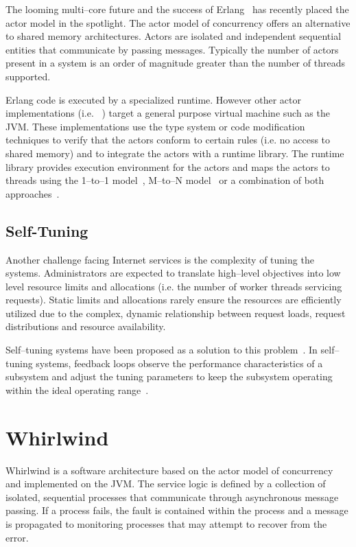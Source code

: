 \documentclass[conference,a4paper,final]{IEEEtran}
\begin{document}
The looming multi--core future and the success of Erlang~\cite{Nystrom:03:Telco,armstrong96erlang} has recently placed the actor model in the spotlight. The actor model of concurrency offers an alternative to shared memory architectures. Actors are isolated and independent sequential entities that communicate by passing messages. Typically the number of actors present in a system is an order of magnitude greater than the number of threads supported.

Erlang code is executed by a specialized runtime. However other actor implementations (i.e. ~\cite{Varela:SALSA,Haller:07:ScalaActors,Srinivasan:08:Kilim}) target a general purpose virtual machine such as the JVM. These implementations use the type system or code modification techniques to verify that the actors conform to certain rules (i.e. no access to shared memory) and to integrate the actors with a runtime library. The runtime library provides execution environment for the actors and maps the actors to threads using the 1--to--1 model~\cite{Varela:SALSA}, M--to--N model~\cite{Srinivasan:08:Kilim,Nystrom:03:Telco,armstrong96erlang} or a combination of both approaches~\cite{Haller:07:ScalaActors}.

\subsection{Self-Tuning}

Another challenge facing Internet services is the complexity of tuning the systems. Administrators are expected to translate high--level objectives into low level resource limits and allocations (i.e. the number of worker threads servicing requests). Static limits and allocations rarely ensure the resources are efficiently utilized due to the complex, dynamic relationship between request loads, request distributions and resource availability. 

Self--tuning systems have been proposed as a solution to this problem~\cite{Kephart03AutonomicVision}. In self--tuning systems, feedback loops observe the performance characteristics of a subsystem and adjust the tuning parameters to keep the subsystem operating within the ideal operating range~\cite{welsh03Adaptive,Heiss:91:AdaptiveLoadControl}.

\section{Whirlwind}

Whirlwind is a software architecture based on the actor model of concurrency and implemented on the JVM. The service logic is defined by a collection of isolated, sequential processes that communicate through asynchronous message passing. If a process fails, the fault is contained within the process and a message is propagated to monitoring processes that may attempt to recover from the error.
\end{document}
